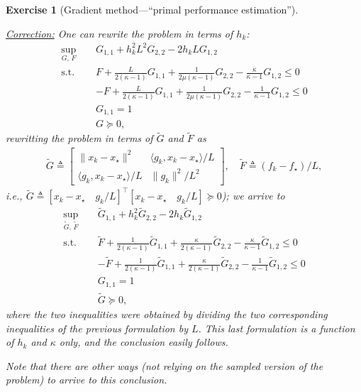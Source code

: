 \documentclass[11pt,a4paper]{article}
\newcommand{\correction}[1]{{{\color{blue}\underline{Correction:} #1}}}
\newcommand{\correction}[1]{}
\newtheorem{exercise}{Exercise}
\begin{document}
\begin{exercise}[Gradient method---``primal performance estimation'']
\begin{enumerate}
	\correction{One can rewrite the problem in terms of $h_k$:\begin{equation*}
			\begin{aligned}
			\sup_{G,\, F} \quad & G_{1,1}+h_k ^2 L^2 G_{2,2}-2h_k L G_{1,2}\\
			\text{s.t. } \quad & F + \tfrac{L}{2(\kappa-1)} G_{1,1}+\tfrac{1}{2\mu(\kappa-1)}G_{2,2}-\tfrac{\kappa}{\kappa-1}G_{1,2}\leqslant 0\\
			&-F + \tfrac{L}{2(\kappa-1)} G_{1,1}+\tfrac{1}{2\mu(\kappa-1)}G_{2,2}-\tfrac{1}{\kappa-1}G_{1,2}\leqslant 0\\
			&G_{1,1}= 1\\
			&G\succcurlyeq 0,
			\end{aligned}
			\end{equation*}
			rewritting the problem in terms of $\tilde{G}$ and $\tilde{F}$ as
			\begin{align*}
			\tilde{G} \triangleq \begin{bmatrix}
			\|x_k-x_\star\|^2 & \langle g_k,x_k-x_\star\rangle/L\\
			\langle g_k, x_k-x_\star\rangle/L & \| g_k\|^2/L^2
			\end{bmatrix},\quad 	\tilde{F} \triangleq 		(	f_k-f_\star)/L,
			\end{align*}
			i.e., $\tilde{G}\triangleq [x_k-x_\star \quad g_k/L]^\top [x_k-x_\star \quad  g_k/L]\succcurlyeq 0$); we arrive to\begin{equation*}
			\begin{aligned}
			\sup_{\tilde{G},\, \tilde{F}} \quad & \tilde{G}_{1,1}+h_k ^2 \tilde{G}_{2,2}-2h_k \tilde{G}_{1,2}\\
			\text{s.t. } \quad & \tilde{F} + \tfrac{1}{2(\kappa-1)} \tilde{G}_{1,1}+\tfrac{\kappa}{2(\kappa-1)}\tilde{G}_{2,2}-\tfrac{\kappa}{\kappa-1}\tilde{G}_{1,2}\leqslant 0\\
			&-\tilde{F} + \tfrac{1}{2(\kappa-1)} \tilde{G}_{1,1}+\tfrac{\kappa}{2(\kappa-1)}\tilde{G}_{2,2}-\tfrac{1}{\kappa-1}\tilde{G}_{1,2}\leqslant 0\\
			&G_{1,1}= 1\\
			&\tilde{G}\succcurlyeq 0,
			\end{aligned}
			\end{equation*}
			where the two inequalities were obtained by dividing the two corresponding inequalities of the previous formulation by $L$. This last formulation is a function of $h_k$ and $\kappa$ only, and the conclusion easily follows.
			
			Note that there are other ways (not relying on the sampled version of the problem) to arrive to this conclusion.}
			

\end{enumerate}
\end{exercise}
\end{document}
